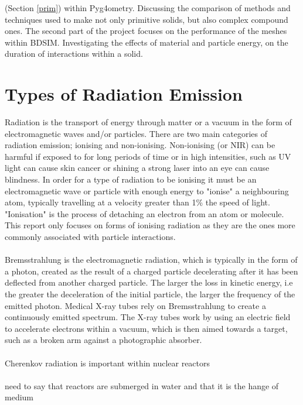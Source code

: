 \documentclass[12pt,a4paper]{article}
\begin{document}
(Section \ref{prim}) within Pyg4ometry.
Discussing the comparison of methods and techniques used to make not only primitive solids, but also complex compound ones. The second part of the project focuses on the performance of the meshes within BDSIM. Investigating the effects of material and particle energy, on the duration of interactions within a solid.



\section{Types of Radiation Emission }
\label{radd}
Radiation is the transport of energy through matter or a vacuum in the form of electromagnetic waves and/or particles. There are two main categories of radiation emission; ionising and non-ionising. Non-ionising (or NIR) can be harmful if exposed to for long periods of time or in high intensities, such as UV light can cause skin cancer or shining a strong laser into an eye can cause blindness. In order for a type of radiation to be ionising it must be an electromagnetic wave or particle with enough energy to "ionise" a neighbouring atom, typically travelling at a velocity greater than 1\% the speed of light.  "Ionisation" is the process of detaching an electron from an atom or molecule. This report only focuses on forms of ionising radiation as they are the ones more commonly associated with particle interactions. 
\\\\ 
\noindent Bremsstrahlung is the electromagnetic radiation, which is typically in the form of a photon, created as the result of a charged particle decelerating after it has been deflected from another charged particle. The larger the loss in kinetic energy, i.e the greater the deceleration of the initial particle, the larger the frequency of the emitted photon. Medical X-ray tubes rely on Bremsstrahlung to create a continuously emitted spectrum. The X-ray tubes work by using an electric field to accelerate electrons within a vacuum, which is then aimed towards a target, such as a broken arm against a photographic absorber.
\\\\
\noindent Cherenkov radiation is important within nuclear reactors \\
\\need to say that reactors are submerged in water and that it is the hange of medium\\
\end{document}
